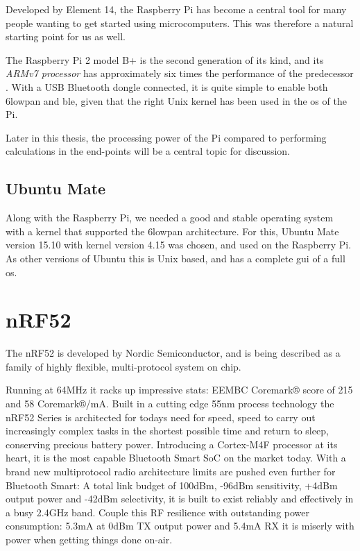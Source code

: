 Developed by Element 14, the Raspberry Pi has become a central tool for many people wanting to get started using microcomputers. This was therefore a natural starting point for us as well. 

The Raspberry Pi 2 model B+ is the second generation of its kind, and its \textit{ARMv7 processor} has approximately six times the performance of the predecessor \cite{raspberryPi2}. With a USB Bluetooth dongle connected, it is quite simple to enable both \gls{6lowpan} and \gls{ble}, given that the right Unix kernel has been used in the \gls{os} of the Pi.

Later in this thesis, the processing power of the Pi compared to performing calculations in the end-points will be a central topic for discussion. 

\subsection{Ubuntu Mate}

Along with the Raspberry Pi, we needed a good and stable operating system with a kernel that supported the \gls{6lowpan} architecture. For this, Ubuntu Mate version 15.10 with kernel version 4.15 was chosen, and used on the Raspberry Pi. As other versions of Ubuntu this is Unix based, and has a complete \gls{gui} of a full \gls{os}. 

\section{nRF52}

The nRF52 is developed by Nordic Semiconductor, and is being described as a family of highly flexible, multi-protocol system on chip. 


\cite{nrf52Nordic}

Running at 64MHz it racks up impressive stats: EEMBC Coremark® score of 215 and 58 Coremark®/mA. Built in a cutting edge 55nm process technology the nRF52 Series is architected for todays need for speed, speed to carry out increasingly complex tasks in the shortest possible time and return to sleep, conserving precious battery power. Introducing a Cortex-M4F processor at its heart, it is the most capable Bluetooth Smart SoC on the market today.	
With a brand new multiprotocol radio architecture limits are pushed even further for Bluetooth Smart: A total link budget of 100dBm, -96dBm sensitivity, +4dBm output power and -42dBm selectivity, it is built to exist reliably and effectively in a busy 2.4GHz band. Couple this RF resilience with outstanding power consumption: 5.3mA at 0dBm TX output power and 5.4mA RX it is miserly with power when getting things done on-air.

